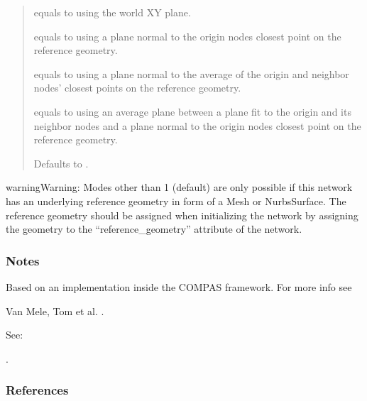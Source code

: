 \documentclass[letterpaper,10pt,english]{sphinxmanual}
\begin{document}
\begin{fulllineitems}
\begin{fulllineitems}
\begin{quote}
\begin{description}
 equals to using the world XY plane.

 equals to using a plane normal to the origin nodes closest
point on the reference geometry.

 equals to using a plane normal to the average of the origin
and neighbor nodes’ closest points on the reference geometry.

 equals to using an average plane between a plane fit to the
origin and its neighbor nodes and a plane normal to the origin
nodes closest point on the reference geometry.

Defaults to .


\end{description}\end{quote}

\begin{sphinxadmonition}{warning}{Warning:}
Modes other than \sphinxhyphen{}1 (default) are only possible if this network has an
underlying reference geometry in form of a Mesh or NurbsSurface. The
reference geometry should be assigned when initializing the network by
assigning the geometry to the “reference\_geometry” attribute of the network.
\end{sphinxadmonition}
\subsubsection*{Notes}

Based on an implementation inside the COMPAS framework.
For more info see %
\begin{footnote}[17]\sphinxAtStartFootnote
Van Mele, Tom et al. .

See: 
%
\end{footnote}.
\subsubsection*{References}

\end{fulllineitems}



\end{fulllineitems}
\end{document}
